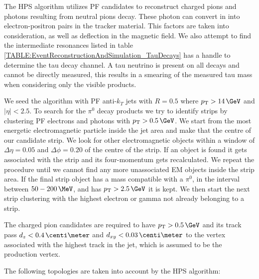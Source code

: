
The \gls{HPS} algorithm utilizes \gls{PF} candidates to reconstruct charged pions and photons resulting from neutral pions decay. These photon can convert in into electron-positron pairs in the tracker material. This factors are taken into consideration, as well as deflection in the magnetic field. We also attempt to find the intermediate resonances listed in table \ref{TABLE:EventReconstructionAndSimulation_TauDecays} has a handle to determine the tau decay channel. A tau neutrino is present on all decays and cannot be directly measured, this results in a smearing of the measured tau mass when considering only the visible products.

We seed the algorithm with \gls{PF} anti-$k_T$ jets with $R = 0.5$ where $\pt>14\,\GeV$ and $|\eta|<2.5$. To search for the $\pi^{0}$ decay products we try to identify strips by clustering \gls{PF} electrons and photons with $\pt>0.5\,\GeV$. We start from the most energetic electromagnetic particle inside the jet area and make that the centre of our candidate strip. We look for other electromagnetic objects within a window of $\Delta\eta = 0.05$ and $\Delta\phi = 0.20$ of the centre of the strip. If an object is found it gets associated with the strip and its four-momentum gets recalculated. We repeat the procedure until we cannot find any more unassociated \gls{EM} objects inside the strip area. If the final strip object has a mass compatible with a $\pi^{0}$, in the interval between $50-200\,\MeV$, and has $\pt > 2.5\,\GeV$ it is kept. We then start the next strip clustering with the highest \pt electron or gamma not already belonging to a strip.

The charged pion candidates are required to have $\pt > 0.5\,\GeV$ and its track pass $d_z < 0.4\,\centi\meter$ and $d_{xy} < 0.03\,\centi\meter$ to the vertex associated with the highest \pt track in the jet, which is assumed to be the \tau production vertex.

The following topologies are taken into account by the \gls{HPS} algorithm:

